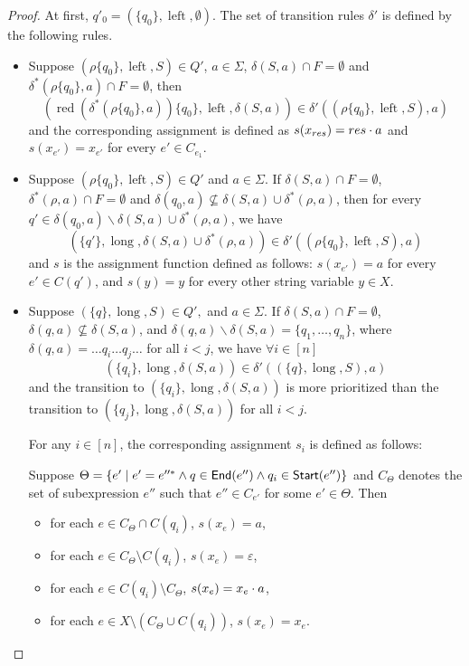 \documentclass[sigplan,review,anonymous]{acmart}\settopmatter{printfolios=true,printccs=false,printacmref=false}
\newcommand{\tmop}[1]{\ensuremath{\operatorname{#1}}}
\newcommand\ssym{{\sf Start}}
\newcommand\esym{{\sf End}}
\begin{document}
\begin{proof}
At first, $q'_0= (\{ q_0
\}, \tmop{left}, \emptyset)$. The set of transition rules $\delta'$ is defined by the following rules.

\begin{itemize}
  
  \item Suppose $(\rho \{ q_0 \}, \tmop{left}, S) \in Q'$, $a \in \Sigma$,
  $\delta (S, a) \cap F = \emptyset$ and $\delta^{\ast} (\rho \{ q_0 \}, a) \cap F =
  \emptyset$, then
  \[ (\tmop{red} (\delta^{\ast} (\rho \{ q_0 \}, a)) \{ q_0 \}, \tmop{left}, \delta
     (S, a)) \in \delta' ((\rho \{ q_0 \}, \tmop{left}, S), a) \]
  and the corresponding assignment is defined as $s(x_{res}) = res \cdot a$ and $s(x_{e'})=x_{e'}$ for
  every $e' \in C_{e_1}$.
  
  \item Suppose $(\rho \{ q_0 \}, \tmop{left}, S) \in Q'$ and $a \in \Sigma$.
  If $\delta (S, a) \cap F = \emptyset$, $\delta^{\ast} (\rho, a) \cap F = \emptyset$
  and $\delta (q_0, a) \nsubseteq \delta (S, a) \cup \delta^{\ast} (\rho, a)$, then
  for every $q' \in \delta (q_0, a) \backslash \delta (S, a) \cup \delta^{\ast}
  (\rho, a)$, we have
  \[ (\{ q' \}, \tmop{long}, \delta (S, a) \cup \delta^{\ast} (\rho, a)) \in \delta'
     ((\rho \{ q_0 \}, \tmop{left}, S), a) \]
  and $s$ is the assignment function defined as follows: $s(x_{e'}) = a$ for every $e'  \in C(q')$, and $s(y)=y$ for every other string variable $y \in X$.
  
  \item Suppose $(\{ q \}, \tmop{long}, S) \in Q',$ and $a \in \Sigma$. If
  $\delta (S, a) \cap F = \emptyset$, $\delta (q, a) \nsubseteq \delta (S,
  a)$, and $\delta (q, a) \backslash \delta (S, a) = \{ q_1, \ldots,
  q_n \}$, where $\delta (q, a) = \ldots q_i \ldots q_j \ldots$ for all $i < j$,
  we have $\forall i \in [n]$
  \[ (\{ q_i \}, \tmop{long}, \delta (S, a)) \in \delta' ((\{ q \},
     \tmop{long}, S), a) \]
  and the transition to $(\{ q_i \}, \tmop{long}, \delta (S, a))$ is more prioritized than the transition to
  $(\{ q_j \}, \tmop{long}, \delta (S, a))$ for all $i < j$. 
  
  For any $i \in [n]$, the corresponding assignment $s_i$ is defined as follows:
  
  Suppose $\Theta = \{e' \mid e' = e''^*  \wedge
  q \in \esym(e'') \wedge q_i \in \ssym(e'') \}$ and $C_{\Theta}$ denotes the set of subexpression $e''$ such that $e'' \in C_{e'}$ for some $e' \in \Theta$.
Then 
\begin{itemize}
\item for each $e \in C_{\Theta} \cap C(q_i)$, $s(x_e) = a$,
%
\item for each $e \in C_{\Theta} \setminus C(q_i)$, $s(x_e) = \varepsilon$, 
%
\item for each $e \in C(q_i) \setminus C_\Theta$, $s(x_e) = x_e \cdot a$,
%
\item for each $e \in X \setminus (C_\Theta \cup C(q_i))$, $s(x_e)= x_e$.
\end{itemize}


\end{itemize}
\end{proof}
\end{document}
